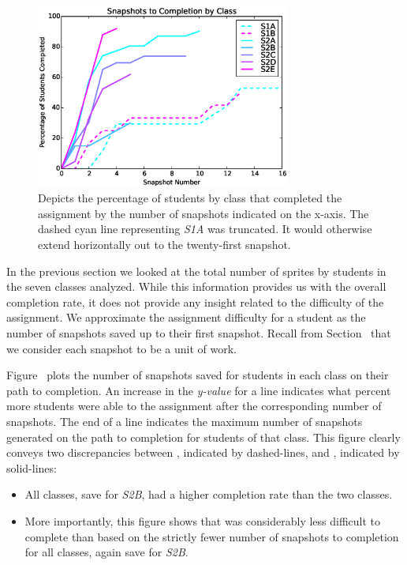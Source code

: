 \begin{figure}[!t]
\centering \includegraphics[width=3.3in]{graphs/snapshots_to_completion.eps}
\caption{Depicts the percentage of students by class that completed the
  assignment by the number of snapshots indicated on the x-axis. The dashed
  cyan line representing \emph{S1A} was truncated. It would otherwise extend
  horizontally out to the twenty-first snapshot.}
\end{figure}

In the previous section we looked at the total number of sprites \caught{} by
students in the seven classes analyzed. While this information provides us with
the overall completion rate, it does not provide any insight related to the
difficulty of the assignment. We approximate the assignment difficulty for a
student as the number of snapshots saved up to their first \com{}
snapshot. Recall from Section~ that we consider each
snapshot to be a unit of work.

Figure~ plots the number of snapshots
saved for students in each class on their path to completion. An increase in
the \emph{y-value} for a line indicates what percent more students were able to
\com{} the assignment after the corresponding number of snapshots. The end of a
line indicates the maximum number of snapshots generated on the path to
completion for students of that class. This figure clearly conveys two
discrepancies between \sone{}, indicated by dashed-lines, and \stwo{},
indicated by solid-lines:

\begin{itemize}
\item All \stwo{} classes, save for \emph{S2B}, had a higher completion rate
  than the two \sone{} classes.
\item More importantly, this figure shows that \stwo{} was considerably less
  difficult to complete than \sone{} based on the strictly fewer number of
  snapshots to completion for all \stwo{} classes, again save for \emph{S2B}.
\end{itemize}

